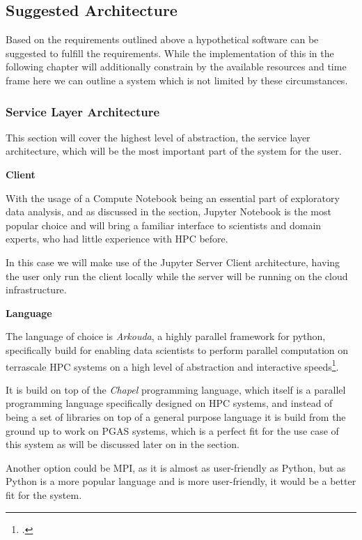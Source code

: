\subsection{Suggested Architecture}
\label{suggested_architecture}

Based on the requirements outlined above a hypothetical software can be suggested
to fulfill the requirements. While the implementation of this in the following chapter will additionally
constrain by the available resources and time frame here we can outline a system which
is not limited by these circumstances.

\subsubsection{Service Layer Architecture}

This section will cover the highest level of abstraction,
the service layer architecture, which will be the most important part of the system for the user.

\textbf{Client}
\label{asp:client}

With the usage of a Compute Notebook being an essential part of exploratory data analysis,
and as discussed in the  section, Jupyter Notebook is the most popular choice
and will bring a familiar interface to scientists and domain experts, who had little experience with \ac{HPC} before.

In  this case we will make use of the Jupyter Server Client architecture,
having the user only run the client locally while the server will be running on the cloud infrastructure.

\textbf{Language}
\label{asp:language}

The language of choice is \textit{Arkouda}, a highly parallel framework for python,
specifically build for enabling data scientists to perform parallel computation on terrascale \ac{HPC} systems on a high level of abstraction
and interactive speeds\footcite{enthoughtArkoudaTerascaleData2020}.

It is build on top of the \textit{Chapel} programming language, which itself is a parallel programming language
specifically designed on \ac{HPC} systems, and instead of being a set of libraries on top of a general purpose language
it is build from the ground up to work on \ac{PGAS} systems, which is a perfect fit for the use case of this system as
will be discussed later on in the  section.

Another option could be \ac{MPI}, as it is almost as user-friendly as Python,
but as Python is a more popular language and is more user-friendly, it would be a better fit for the system.

